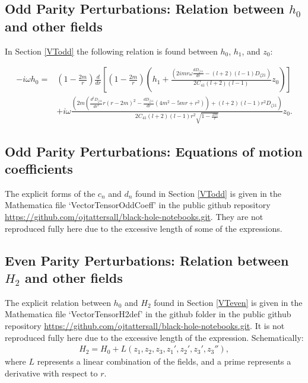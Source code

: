 \documentclass[10pt,twocolumn,preprintnumbers,amsmath,amssymb,nofootinbib
,superscriptaddress]{revtex4-1}
\begin{document}
{{{\subsection{Odd Parity Perturbations: Relation between $h_0$ and other fields} \label{appendixVTOdd}
In Section \ref{VTodd} the following relation is found between $h_0$, $h_1$, and $z_0$:
\begin{widetext}
\begin{align}
-i\omega h_0=&\left(1-\frac{2m}{r}\right)\frac{d}{dr}\left[\left(1-\frac{2m}{r}\right)\left(h_1+\frac{\left(2imr\omega\frac{dD_{\zeta11}}{dr}-(l+2)(l-1)D_{\zeta21}\right)}{2C_{41}(l+2)(l-1)}z_0\right)\right]\nonumber\\
&+i\omega\frac{\left(2m\left(\frac{d^2D_{\zeta11}}{dr^2}r(r-2m)^2-\frac{dD_{\zeta11}}{dr}\left(4m^2-5mr+r^2\right)\right)+(l+2)(l-1)r^2D_{\zeta11}\right)}{2C_{41}(l+2)(l-1)r^2\sqrt{1-\frac{2m}{r}}}z_0.
\end{align}
\end{widetext}

\subsection{Odd Parity Perturbations: Equations of motion coefficients}\label{appendixVTOddEq}
The explicit forms of the $c_n$ and $d_n$ found in Section \ref{VTodd} is given in the Mathematica file `VectorTensorOddCoeff' in the public github repository \url{https://github.com/ojtattersall/black-hole-notebooks.git}. They are not reproduced fully here due to the excessive length of some of the expressions.

\subsection{Even Parity Perturbations: Relation between $H_2$ and other fields}\label{appendixVTEven}
The explicit relation between $h_0$ and $H_2$ found in Section \ref{VTeven} is given in the Mathematica file `VectorTensorH2def' in the github folder in the public github repository \url{https://github.com/ojtattersall/black-hole-notebooks.git}. It is not reproduced fully here due to the excessive length of the expression. Schematically:
\begin{align}
H_2=H_0 + L(z_1, z_2, z_3, z_1', z_2', z_3', z_3''),
\end{align} 
where $L$ represents a linear combination of the fields, and a prime represents a derivative with respect to $r$.

}}}
\end{document}
